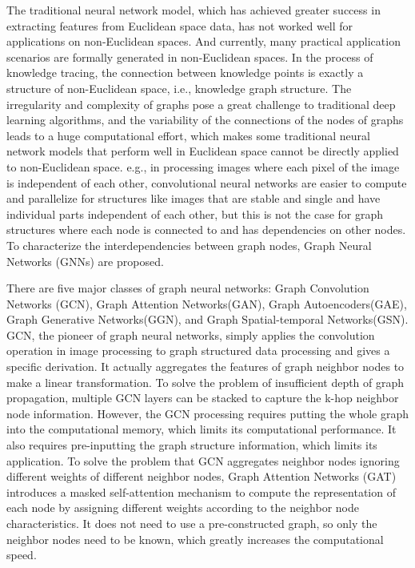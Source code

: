 
The traditional neural network model, which has achieved greater success in extracting features from Euclidean space data, has not worked well for applications on non-Euclidean spaces. And currently, many practical application scenarios are formally generated in non-Euclidean spaces. In the process of knowledge tracing, the connection between knowledge points is exactly a structure of non-Euclidean space, i.e., knowledge graph structure. The irregularity and complexity of graphs pose a great challenge to traditional deep learning algorithms, and the variability of the connections of the nodes of graphs leads to a huge computational effort, which makes some traditional neural network models that perform well in Euclidean space cannot be directly applied to non-Euclidean space. e.g., in processing images where each pixel of the image is independent of each other, convolutional neural networks are easier to compute and parallelize for structures like images that are stable and single and have individual parts independent of each other, but this is not the case for graph structures where each node is connected to and has dependencies on other nodes. To characterize the interdependencies between graph nodes, Graph Neural Networks (GNNs) are proposed.

There are five major classes of graph neural networks: Graph Convolution Networks (GCN), Graph Attention Networks(GAN), Graph Autoencoders(GAE), Graph Generative Networks(GGN), and Graph Spatial-temporal Networks(GSN). GCN, the pioneer of graph neural networks, simply applies the convolution operation in image processing to graph structured data processing and gives a specific derivation. It actually aggregates the features of graph neighbor nodes to make a linear transformation. To solve the problem of insufficient depth of graph propagation, multiple GCN layers can be stacked to capture the k-hop neighbor node information. However, the GCN processing requires putting the whole graph into the computational memory, which limits its computational performance. It also requires pre-inputting the graph structure information, which limits its application. To solve the problem that GCN aggregates neighbor nodes ignoring different weights of different neighbor nodes, Graph Attention Networks (GAT) introduces a masked self-attention mechanism to compute the representation of each node by assigning different weights according to the neighbor node characteristics. It does not need to use a pre-constructed graph, so only the neighbor nodes need to be known, which greatly increases the computational speed.

